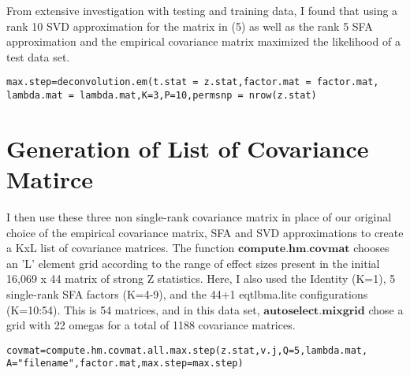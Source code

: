 \documentclass[10pt]{article}
\begin{document}
\begin{itemize}
From extensive investigation with testing and training data, I found that using a rank 10 SVD approximation for the matrix in (5) as well as the rank 5 SFA approximation and the empirical covariance matrix maximized the likelihood of a test data set. 
\begin{verbatim}
max.step=deconvolution.em(t.stat = z.stat,factor.mat = factor.mat,
lambda.mat = lambda.mat,K=3,P=10,permsnp = nrow(z.stat)
\end{verbatim}
%  
%  
%  
%


\section{Generation of List of Covariance Matirce}
I then use these three non single-rank covariance matrix in place of our original choice of the empirical covariance matrix, SFA and SVD approximations to create a KxL list of covariance matrices. The function $\textbf{compute.hm.covmat}$ chooses an 'L' element grid according to the range of effect sizes present in the initial 16,069 x 44 matrix of strong Z statistics. 
Here, I also used the Identity (K=1), 5 single-rank SFA factors (K=4-9), and the 44+1 eqtlbma.lite configurations (K=10:54). This is 54 matrices, and in this data set, $\textbf{autoselect.mixgrid}$ chose a grid with 22 omegas for a total of 1188 covariance matrices.

\begin{verbatim}
covmat=compute.hm.covmat.all.max.step(z.stat,v.j,Q=5,lambda.mat,
A="filename",factor.mat,max.step=max.step)


\end{verbatim}
\end{itemize}
\end{document}
